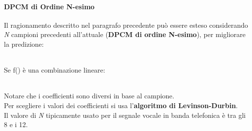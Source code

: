 \documentclass{article}
\begin{document}
				\paragraph{DPCM di Ordine N-esimo\\}
					Il ragionamento descritto nel paragrafo precedente può essere esteso considerando \textit{N} campioni precedenti all'attuale (\textbf{DPCM di ordine N-esimo}), per migliorare la predizione:
					\begin{figure}[ht!]
					\end{figure}
					\\Se f() è una combinazione lineare:
					\begin{figure}[ht!]
					\end{figure}
					\\Notare che i coefficienti sono diversi in base al campione.
					\\Per scegliere i valori dei coefficienti si usa l'\textbf{algoritmo di Levinson-Durbin}.
					\\Il valore di \textit{N} tipicamente usato per il segnale vocale in banda telefonica è tra gli 8 e i 12.
\end{document}
